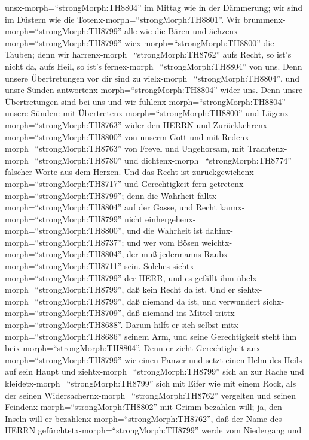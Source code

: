 unsx-morph=``strongMorph:TH8804'' im Mittag wie in der Dämmerung; wir
sind im Düstern wie die Totenx-morph=``strongMorph:TH8801''.
 Wir brummenx-morph=``strongMorph:TH8799'' alle wie die
Bären und ächzenx-morph=``strongMorph:TH8799''
wiex-morph=``strongMorph:TH8800'' die Tauben; denn wir
harrenx-morph=``strongMorph:TH8762'' aufs Recht, so ist's nicht da, aufs
Heil, so ist's fernex-morph=``strongMorph:TH8804'' von uns.
 Denn unsere Übertretungen vor dir sind zu
vielx-morph=``strongMorph:TH8804'', und unsre Sünden
antwortenx-morph=``strongMorph:TH8804'' wider uns. Denn unsre
Übertretungen sind bei uns und wir fühlenx-morph=``strongMorph:TH8804''
unsere Sünden:  mit
Übertretenx-morph=``strongMorph:TH8800'' und
Lügenx-morph=``strongMorph:TH8763'' wider den HERRN und
Zurückkehrenx-morph=``strongMorph:TH8800'' von unserm Gott und mit
Redenx-morph=``strongMorph:TH8763'' von Frevel und Ungehorsam, mit
Trachtenx-morph=``strongMorph:TH8780'' und
dichtenx-morph=``strongMorph:TH8774'' falscher Worte aus dem Herzen.
 Und das Recht ist
zurückgewichenx-morph=``strongMorph:TH8717'' und Gerechtigkeit fern
getretenx-morph=``strongMorph:TH8799''; denn die Wahrheit
fälltx-morph=``strongMorph:TH8804'' auf der Gasse, und Recht
kannx-morph=``strongMorph:TH8799'' nicht
einhergehenx-morph=``strongMorph:TH8800'',  und die
Wahrheit ist dahinx-morph=``strongMorph:TH8737''; und wer vom Bösen
weichtx-morph=``strongMorph:TH8804'', der muß jedermanns
Raubx-morph=``strongMorph:TH8711'' sein. Solches
siehtx-morph=``strongMorph:TH8799'' der HERR, und es gefällt ihm
übelx-morph=``strongMorph:TH8799'', daß kein Recht da ist. 
Und er siehtx-morph=``strongMorph:TH8799'', daß niemand da ist, und
verwundert sichx-morph=``strongMorph:TH8709'', daß niemand ins Mittel
trittx-morph=``strongMorph:TH8688''. Darum hilft er sich selbst
mitx-morph=``strongMorph:TH8686'' seinem Arm, und seine Gerechtigkeit
steht ihm beix-morph=``strongMorph:TH8804''.  Denn er zieht
Gerechtigkeit anx-morph=``strongMorph:TH8799'' wie einen Panzer und
setzt einen Helm des Heils auf sein Haupt und
ziehtx-morph=``strongMorph:TH8799'' sich an zur Rache und
kleidetx-morph=``strongMorph:TH8799'' sich mit Eifer wie mit einem Rock,
 als der seinen Widersachernx-morph=``strongMorph:TH8762''
vergelten und seinen Feindenx-morph=``strongMorph:TH8802'' mit Grimm
bezahlen will; ja, den Inseln will er
bezahlenx-morph=``strongMorph:TH8762'',  daß der Name des
HERRN gefürchtetx-morph=``strongMorph:TH8799'' werde vom Niedergang und
